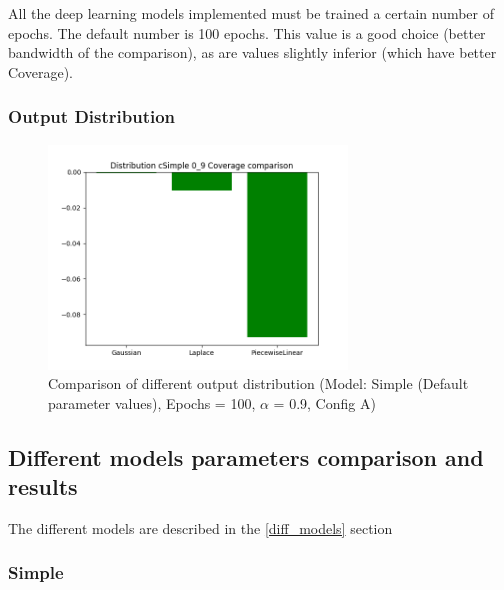All the deep learning models implemented must be trained a certain number of epochs. The default number 
is 100 epochs. This value is a good choice (better bandwidth of the comparison), as are values slightly  inferior (which have better Coverage). 

\newpage

\subsubsection{Output Distribution} \label{comp2_outdistrib}

\begin{figure}[H]
    \centering
    \includegraphics[width=300px]{plots/hist/a/distribution/cSimple/0_9/Coverage.png}
    \caption{Comparison of different output distribution (Model: Simple (Default parameter values), Epochs = 100, $\alpha$ = 0.9,  Config A)}
    \label{fig:comp2_outdistrib}
\end{figure}



\subsection{Different models parameters comparison and results} \label{comp2_model_param}

The different models are described in the \ref{diff_models} section

\subsubsection{Simple} \label{comp2_simple}

